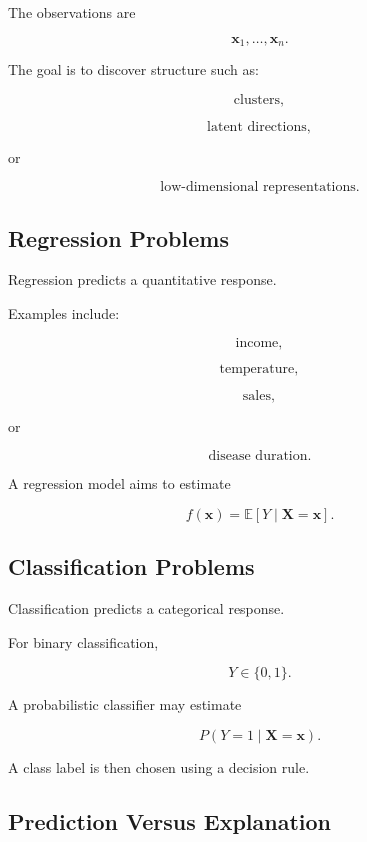 The observations are

\[
\boxed{
\mathbf{x}_1,\ldots,\mathbf{x}_n.
}
\]

The goal is to discover structure such as:

\[
\boxed{
\text{clusters},
}
\]

\[
\boxed{
\text{latent directions},
}
\]

or

\[
\boxed{
\text{low-dimensional representations}.
}
\]

\subsection{Regression Problems}
\label{subsec:statistical-learning-regression}

Regression predicts a quantitative response.

Examples include:

\[
\boxed{
\text{income},
}
\]

\[
\boxed{
\text{temperature},
}
\]

\[
\boxed{
\text{sales},
}
\]

or

\[
\boxed{
\text{disease duration}.
}
\]

A regression model aims to estimate

\[
\boxed{
f(\mathbf{x})
=
\mathbb{E}
[
Y\mid\mathbf{X}=\mathbf{x}
].
}
\]

\subsection{Classification Problems}
\label{subsec:statistical-learning-classification}

Classification predicts a categorical response.

For binary classification,

\[
\boxed{
Y\in\{0,1\}.
}
\]

A probabilistic classifier may estimate

\[
\boxed{
P
(
Y=1
\mid
\mathbf{X}=\mathbf{x}
).
}
\]

A class label is then chosen using a decision rule.

\subsection{Prediction Versus Explanation}
\label{subsec:prediction-versus-explanation}

